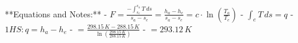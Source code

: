 **Equations and Notes:**  
- \( F = \frac{- \int_{s_e}^{s_a} T \, ds}{s_a - s_e} = \frac{h_a - h_e}{s_a - s_e} = c \cdot \ln \left( \frac{T_a}{T_e} \right) \)  
- \( \int_e T \, ds = q \)  
- \( 1HS: q = h_a - h_e \)  
- \( = \frac{298.15 \, K - 288.15 \, K}{\ln \left( \frac{298.15 \, K}{288.15 \, K} \right)} \)  
- \( = 293.12 \, K \)